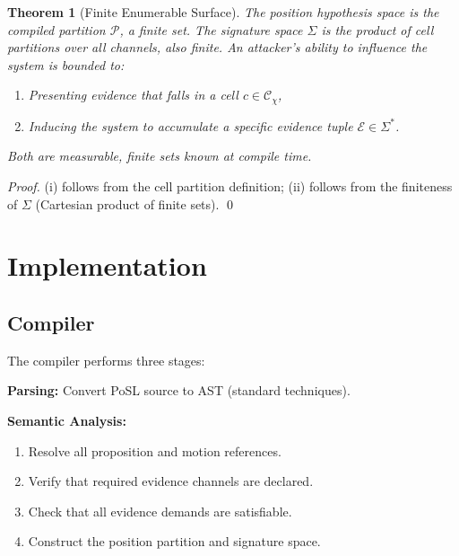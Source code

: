 \documentclass[twocolumn,10pt]{article}
\newtheorem{theorem}{Theorem}[section]
\newcommand{\calC}{\mathcal{C}}     %
\newcommand{\calP}{\mathcal{P}}     %
\begin{document}
\begin{theorem}[Finite Enumerable Surface]
\label{thm:surface}
The position hypothesis space is the compiled partition $\calP$, a finite
set. The signature space $\Sigma$ is the product of cell partitions over
all channels, also finite. An attacker's ability to influence the system
is bounded to:
\begin{enumerate}[leftmargin=1.5em,topsep=2pt,itemsep=1pt]
  \item[(i)] Presenting evidence that falls in a cell $c \in \calC_\chi$,
  \item[(ii)] Inducing the system to accumulate a specific evidence tuple
    $\mathcal{E} \in \Sigma^*$.
\end{enumerate}
Both are measurable, finite sets known at compile time.
\end{theorem}

\begin{proof}
(i) follows from the cell partition definition; (ii) follows from the
finiteness of $\Sigma$ (Cartesian product of finite sets). \qed
\end{proof}

\section{Implementation}
\label{sec:impl}

\subsection{Compiler}

The compiler performs three stages:

\textbf{Parsing:} Convert PoSL source to AST (standard techniques).

\textbf{Semantic Analysis:}
\begin{enumerate}[leftmargin=1.5em,topsep=2pt,itemsep=1pt]
  \item Resolve all proposition and motion references.
  \item Verify that required evidence channels are declared.
  \item Check that all evidence demands are satisfiable.
  \item Construct the position partition and signature space.
\end{enumerate}
\end{document}
